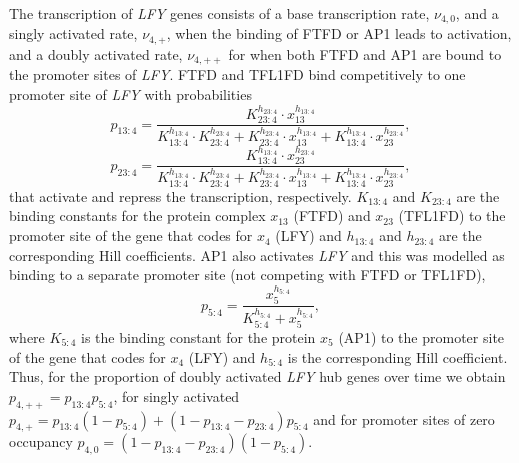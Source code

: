 The transcription of \emph{LFY} genes consists of a base transcription rate, $\nu_{4,0}$, and a singly activated rate,  $\nu_{4,+}$, when the binding of FTFD or AP1 leads to activation, and a doubly activated rate, $\nu_{4,++}$ for when both FTFD and AP1 are bound to the promoter sites of \emph{LFY}.
FTFD and TFL1FD bind competitively to one promoter site of \emph{LFY} with probabilities
%
\begin{equation*}
p_{13:4} = \frac{K_{23:4}^{h_{23:4}} \cdot x_{13}^{h_{13:4}}}
{K_{13:4}^{h_{13:4}} \cdot K_{23:4}^{h_{23:4}}+ K_{23:4}^{h_{23:4}} \cdot x_{13}^{h_{13:4}}
+ K_{13:4}^{h_{13:4}} \cdot x_{23}^{h_{23:4}}},
\end{equation*}
%
 \begin{equation*}
p_{23:4} = \frac{K_{13:4}^{h_{13:4}} \cdot x_{23}^{h_{23:4}}}
{K_{13:4}^{h_{13:4}} \cdot K_{23:4}^{h_{23:4}}+ K_{23:4}^{h_{23:4}} \cdot x_{13}^{h_{13:4}}
+ K_{13:4}^{h_{13:4}} \cdot x_{23}^{h_{23:4}}},
\end{equation*}
that activate and repress the transcription, respectively. $K_{13:4}$ and $K_{23:4}$ are the binding constants for the protein complex $x_{13}$ (FTFD) and $x_{23}$ (TFL1FD) to the promoter site of the gene that codes for $x_4$ (LFY) and $h_{13:4}$ and $h_{23:4}$ are the corresponding Hill coefficients. 
AP1 also activates \emph{LFY} and this was modelled as binding to a separate promoter site (not competing with FTFD or TFL1FD), 
%
\begin{equation*}
p_{5:4} = \frac{x_{5}^{h_{5:4}}}{K_{5:4}^{h_{5:4}}+x_{5}^{h_{5:4}}}, 
\end{equation*}
%
where $K_{5:4}$ is the binding constant for the protein $x_{5}$ (AP1) to the promoter site of the gene that codes for $x_4$ (LFY) and $h_{5:4}$ is the corresponding Hill coefficient. 
Thus, for the proportion of doubly activated \emph{LFY} hub genes over time we obtain $p_{4,++} = p_{13:4} p_{5:4}$, for singly activated $p_{4,+} = p_{13:4} (1-p_{5:4}) + (1-p_{13:4} - p_{23:4}) p_{5:4}$ and for promoter sites of zero occupancy $p_{4,0} = (1-p_{13:4} - p_{23:4}) (1 - p_{5:4})$. 

